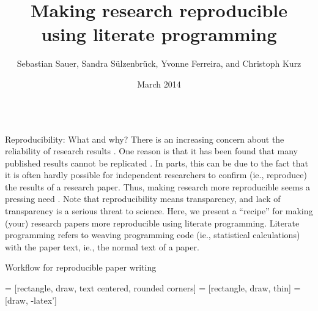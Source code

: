 \documentclass[final,hyperref={pdfpagelabels=false}]{beamer}
\title{Making research reproducible \\using literate programming}
\author{Sebastian Sauer, Sandra S\"ulzenbr\"uck, Yvonne Ferreira, and Christoph Kurz}
\institute{FOM University of Applied Sciences, Helmholtz Zentrum M\"unchen}
\date{March 2014}
\begin{document}
  \begin{frame}{} 
    
      \begin{columns}[t]
      
      \begin{column}{.48\linewidth}
      
        \begin{block}{Reproducibility: What and why?}
      There is an increasing concern about the reliability of research results \cite{Peng2015}. One reason is that
    it has been found that many published results cannot be replicated \cite{OpenScienceCollaboration2015}.
    In parts, this can be due to the fact that it is often hardly possible for independent researchers to
    confirm (ie., reproduce) the results of a research paper. Thus, making research more reproducible seems a pressing need  \cite{Peng2015}. Note that reproducibility means transparency, and lack of transparency is a serious threat to science.
    Here, we present a ``recipe'' for making (your) research papers more reproducible using literate programming.
    Literate programming refers to weaving programming code (ie., statistical calculations) with the paper text, ie., the normal text of a paper.    
    
    \end{block}
      
      
      
            \begin{block}{Workflow for reproducible paper writing}
         
      \begin{minipage}[t]{0.45\textwidth}
       = [rectangle, draw, text centered, rounded corners]
       = [rectangle, draw, thin]
       = [draw, -latex']
      \begin{tikzpicture}[node distance=7cm, auto]
        

\end{tikzpicture}
\end{minipage}
\end{block}
\end{column}
\end{columns}
\end{frame}
\end{document}
